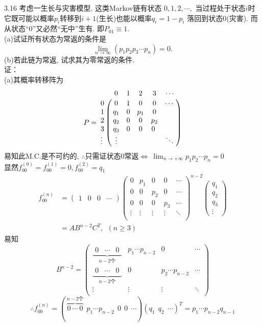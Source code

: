 3.16 考虑一生长与灾害模型. 这类Markov链有状态 $0,1,2,\cdots,$ 当过程处于状态$i$时它既可能以概率$p_i$转移到$i+1$(生长)也能以概率$q_i = 1 - p_i$ 落回到状态$0$(灾害). 而从状态“0”又必然“无中”生有. 即$P_{01} \equiv 1$.\\
(a)试证所有状态为常返的条件是
\[
\lim_{n \rightarrow \infty}(p_1p_2p_3\cdots p_n) = 0.
\]
(b)若此链为常返, 试求其为零常返的条件.\\
证：\\
(a)其概率转移阵为
\[
P =
\bordermatrix{
	~ & 0   & 1 & 2   & 3   & \cdots \cr
	0 & 0   & 1 & 0   & 0   & \cdots \cr
	1 & q_1 & 0 & p_1 & 0   & ~ \cr
	2 & q_2 & 0 & 0   & p_2 & ~ \cr
	3 & q_3 & 0 & 0   & 0 ~ \cr
	\vdots & \vdots & ~ & ~ & ~ & \ddots \cr
}
\]
易知此M.C.是不可约的, $\therefore$只需证状态$0$常返$\Leftrightarrow~\lim_{n\rightarrow +\infty}p_1p_2\cdots p_n = 0$\\
显然$f^{(0)}_{00} = f^{(1)}_{00} = 0, f^{(2)}_{00} = q_1$
\[
\begin{split}
f^{(n)}_{00} & =
\begin{pmatrix}
1 & 0 & 0 & \cdots
\end{pmatrix}
\begin{pmatrix}
0 & p_1 & 0 & 0 & \cdots\\
0 & 0 & p_2 & 0 & \cdots\\
0 & 0 & 0 & p_3 & \cdots\\
\vdots & \vdots & \vdots & \vdots & \ddots\\
\end{pmatrix}^{n-2}
\begin{pmatrix}
q_1\\
q_2\\
q_3\\
\vdots
\end{pmatrix}\\
& = AB^{n-2}C^T, ~~(n\geqslant 3)
\end{split}
\]
易知
\[
B^{n-2} =
\begin{pmatrix}
\underbrace{\begin{matrix}0 & \cdots & 0\end{matrix}}_{n-2\text{个}} & p_1\cdots p_{n-2} & 0 & \cdots \\
\underbrace{\begin{matrix}0 & \cdots & 0\end{matrix}}_{n-2\text{个}} & 0 & p_2\cdots p_{n-2} & \cdots \\
\vdots & \vdots & \vdots & \ddots\\
\end{pmatrix}
\]
\[
\therefore f^{(n)}_{00} = (\,\overbrace{0~\cdots~0}^{n-2\text{个}}~~p_1\cdots p_{n-2}~~0~~0~~\cdots)(q_1~~q_2~~\cdots)^T = p_1\cdots p_{n-2}q_{n-1}
\]
